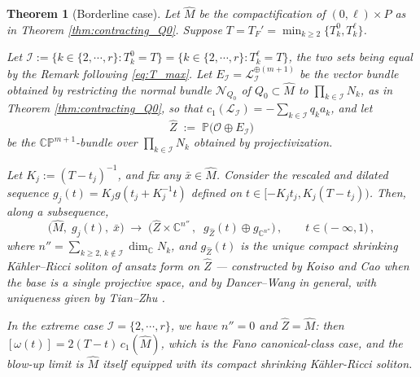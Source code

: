 \documentclass[11pt]{amsart}
\theoremstyle{plain}
\numberwithin{equation}{section}
\newtheorem{theorem}{Theorem}[section]
\theoremstyle{definition}
\theoremstyle{remark}
\begin{document}
\begin{theorem}[Borderline case]
\label{thm:borderline}
Let $\widehat{M}$ be the compactification of $(0,\ell) \times P$ as in Theorem \ref{thm:contracting_Q0}. Suppose
$T = T_F' = \min_{k \geq 2}\big\{T_k^0, T_k^\ell\big\}$.

Let $\mathcal{I} := \big\{k \in \{2,\cdots,r\} : T_k^0 = T\big\} = \big\{k \in \{2,\cdots,r\} : T_k^\ell = T\big\}$, the two sets being equal by the Remark following \eqref{eq:T_max}. Let $E_{\mathcal{I}} = \mathcal{L}_{\mathcal{I}}^{\oplus(m+1)}$ be the vector bundle obtained by restricting the normal bundle $\mathcal{N}_{Q_0}$ of $Q_0 \subset \widehat{M}$ to $\prod_{k \in \mathcal{I}} N_k$, as in Theorem \ref{thm:contracting_Q0}, so that $c_1(\mathcal{L}_{\mathcal{I}}) = -\sum_{k \in \mathcal{I}} q_k a_k$, and let
\[\widehat{Z} \;:=\; \mathbb{P}\big(\mathcal{O} \oplus E_{\mathcal{I}}\big)\]
be the $\mathbb{CP}^{m+1}$-bundle over $\prod_{k \in \mathcal{I}} N_k$ obtained by projectivization. 

Let $K_j := (T-t_j)^{-1}$, and fix any $\bar{x} \in \widehat{M}$. Consider the rescaled and dilated sequence $g_j(t) = K_j g(t_j + K_j^{-1}t)$ defined on $t \in [-K_j t_j, K_j(T-t_j))$. Then, along a subsequence,
\begin{equation}\label{eq:limit_borderline}
\big( \widehat{M}, \; g_j (t), \; \bar{x} \big) \;\longrightarrow\; \Big( \widehat{Z} \times \mathbb{C}^{n''} \,, \;\; g_{\widehat{Z}} (t) \oplus g_{\mathbb{C}^{n''}} \Big) \,, \qquad t \in \big( - \infty, 1 \big)\,,
\end{equation}
where $n'' = \sum_{k \geq 2, \, k \not\in \mathcal{I}} \dim_{\mathbb{C}} N_{k}$, and $g_{\widehat{Z}}(t)$ is the unique compact shrinking K\"ahler--Ricci soliton of ansatz form on $\widehat{Z}$ --- constructed by Koiso \cite{Koiso} and Cao \cite{Cao96} when the base is a single projective space, and by Dancer--Wang \cite{DW2011} in general, with uniqueness given by Tian--Zhu \cite{TZhu}.

In the extreme case $\mathcal{I} = \{2, \cdots, r\}$, we have $n'' = 0$ and $\widehat{Z} = \widehat{M}$: then $[\omega(t)] = 2(T-t)\,c_1(\widehat{M})$, which is the Fano canonical-class case, and the blow-up limit is $\widehat{M}$ itself equipped with its compact shrinking K\"ahler-Ricci soliton.
\end{theorem}
\end{document}
